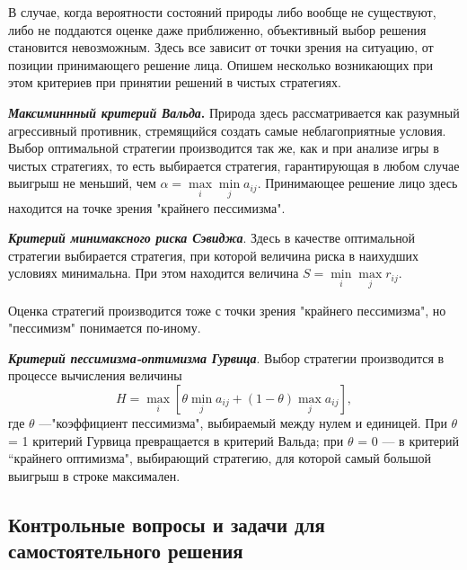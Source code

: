 В случае, когда вероятности состояний природы либо вообще не существуют, либо не поддаются оценке даже приближенно, объективный выбор решения становится невозможным. Здесь все зависит от точки зрения на ситуацию, от позиции принимающего решение лица. Опишем несколько возникающих при этом критериев при принятии решений в чистых стратегиях.

\textbf{\emph{Максиминнный критерий Вальда}.} Природа здесь рассматривается как разумный агрессивный противник, стремящийся создать самые неблагоприятные условия. Выбор оптимальной стратегии производится так же, как и при анализе игры в чистых стратегиях, то есть выбирается стратегия, гарантирующая в любом случае выигрыш не меньший, чем $\alpha = \max\limits_{i} \min\limits_{j} a_{ij}$. Принимающее решение лицо здесь находится на точке зрения "крайнего пессимизма".

\textbf{\emph{Критерий минимаксного риска Сэвиджа}}. Здесь в качестве оптимальной стратегии выбирается стратегия, при которой величина риска в наихудших условиях минимальна.  При этом находится величина $S = \min\limits_{i} \max\limits_{j} r_{ij}$.

Оценка стратегий производится тоже с точки зрения "крайнего пессимизма", но "пессимизм" понимается по-иному.

\textbf{\emph{Критерий пессимизма-оптимизма Гурвица}}. Выбор стратегии производится в процессе вычисления величины
\begin{equation}
\label{equation_4_60}
   H = \max\limits_i[\theta \min\limits_j a_{ij} + (1 - \theta) \max\limits_j a_{ij}],
\end{equation}
где $\theta$ —"коэффициент пессимизма", выбираемый между нулем и единицей. При $\theta$ = 1 критерий Гурвица превращается в критерий Вальда; при $\theta$ = 0 — в критерий “крайнего оптимизма",  выбирающий стратегию, для которой самый большой выигрыш в строке максимален.

\subsection*{Контрольные вопросы и задачи для самостоятельного решения}

